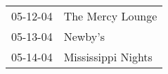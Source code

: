 \begin{supertabular}{p{0.25\columnwidth}p{0.75\columnwidth}}
 05-12-04 &    The Mercy Lounge \\
 05-13-04 &             Newby's \\
 05-14-04 &  Mississippi Nights \\
\end{supertabular}
